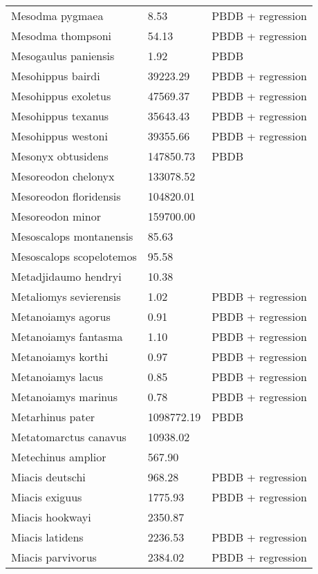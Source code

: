 \documentclass{article}
\begin{document}
\begin{center}
\begin{longtable}{p{} p{} p{}}
    Mesodma pygmaea & 8.53 & PBDB + regression \\ 
    Mesodma thompsoni & 54.13 & PBDB + regression \\ 
    Mesogaulus paniensis & 1.92 & PBDB \\ 
    Mesohippus bairdi & 39223.29 & PBDB + regression \\ 
    Mesohippus exoletus & 47569.37 & PBDB + regression \\ 
    Mesohippus texanus & 35643.43 & PBDB + regression \\ 
    Mesohippus westoni & 39355.66 & PBDB + regression \\ 
    Mesonyx obtusidens & 147850.73 & PBDB \\ 
    Mesoreodon chelonyx & 133078.52 & \cite{Bever2003} \\ 
    Mesoreodon floridensis & 104820.01 & \cite{Tomiya2013} \\ 
    Mesoreodon minor & 159700.00 & \cite{McKenna2011} \\ 
    Mesoscalops montanensis & 85.63 & \cite{Tomiya2013} \\ 
    Mesoscalops scopelotemos & 95.58 & \cite{Tomiya2013} \\ 
    Metadjidaumo hendryi & 10.38 & \cite{Tomiya2013} \\ 
    Metaliomys sevierensis & 1.02 & PBDB + regression \\ 
    Metanoiamys agorus & 0.91 & PBDB + regression \\ 
    Metanoiamys fantasma & 1.10 & PBDB + regression \\ 
    Metanoiamys korthi & 0.97 & PBDB + regression \\ 
    Metanoiamys lacus & 0.85 & PBDB + regression \\ 
    Metanoiamys marinus & 0.78 & PBDB + regression \\ 
    Metarhinus pater & 1098772.19 & PBDB \\ 
    Metatomarctus canavus & 10938.02 & \cite{Tomiya2013} \\ 
    Metechinus amplior & 567.90 & \cite{Tedford1994} \\ 
    Miacis deutschi & 968.28 & PBDB + regression \\ 
    Miacis exiguus & 1775.93 & PBDB + regression \\ 
    Miacis hookwayi & 2350.87 & \cite{Patton1973} \\ 
    Miacis latidens & 2236.53 & PBDB + regression \\ 
    Miacis parvivorus & 2384.02 & PBDB + regression \\ 

\end{longtable}
\end{center}
\end{document}
